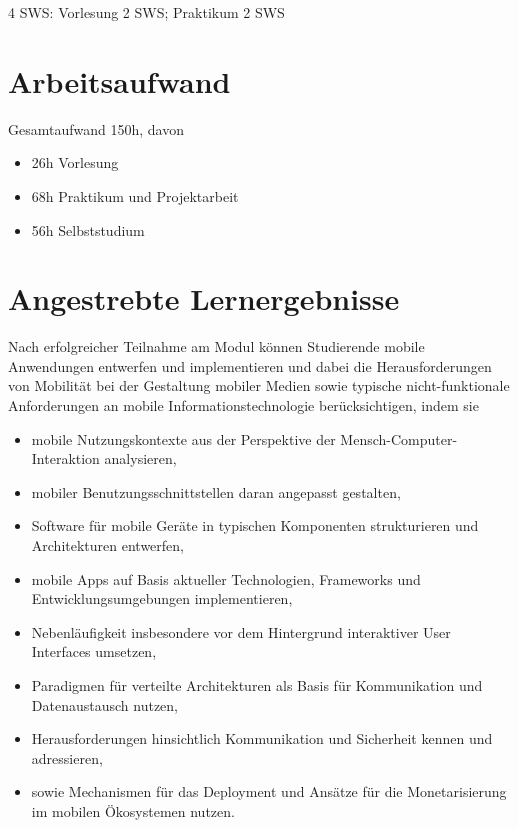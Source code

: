 4 SWS: Vorlesung 2 SWS; Praktikum 2 SWS

\hypertarget{arbeitsaufwandpathlabelmi-2017modulbeschreibungen-bachelorba_mobile-computing}{%
\section*{Arbeitsaufwand\label{/mi-2017/modulbeschreibungen-bachelor/BA_Mobile-Computing}}\label{arbeitsaufwandpathlabelmi-2017modulbeschreibungen-bachelorba_mobile-computing}}

Gesamtaufwand 150h, davon

\begin{itemize}
\tightlist
\item
  26h Vorlesung
\item
  68h Praktikum und Projektarbeit
\item
  56h Selbststudium
\end{itemize}

\hypertarget{angestrebte-lernergebnissepathlabelmi-2017modulbeschreibungen-bachelorba_mobile-computing}{%
\section*{Angestrebte
Lernergebnisse\label{/mi-2017/modulbeschreibungen-bachelor/BA_Mobile-Computing}}\label{angestrebte-lernergebnissepathlabelmi-2017modulbeschreibungen-bachelorba_mobile-computing}}

Nach erfolgreicher Teilnahme am Modul können Studierende mobile
Anwendungen entwerfen und implementieren und dabei die Herausforderungen
von Mobilität bei der Gestaltung mobiler Medien sowie typische
nicht-funktionale Anforderungen an mobile Informationstechnologie
berücksichtigen, indem sie

\begin{itemize}
\tightlist
\item
  mobile Nutzungskontexte aus der Perspektive der
  Mensch-Computer-Interaktion analysieren,
\item
  mobiler Benutzungsschnittstellen daran angepasst gestalten,
\item
  Software für mobile Geräte in typischen Komponenten strukturieren und
  Architekturen entwerfen,
\item
  mobile Apps auf Basis aktueller Technologien, Frameworks und
  Entwicklungsumgebungen implementieren,
\item
  Nebenläufigkeit insbesondere vor dem Hintergrund interaktiver User
  Interfaces umsetzen,
\item
  Paradigmen für verteilte Architekturen als Basis für Kommunikation und
  Datenaustausch nutzen,
\item
  Herausforderungen hinsichtlich Kommunikation und Sicherheit kennen und
  adressieren,
\item
  sowie Mechanismen für das Deployment und Ansätze für die
  Monetarisierung im mobilen Ökosystemen nutzen.
\end{itemize}


